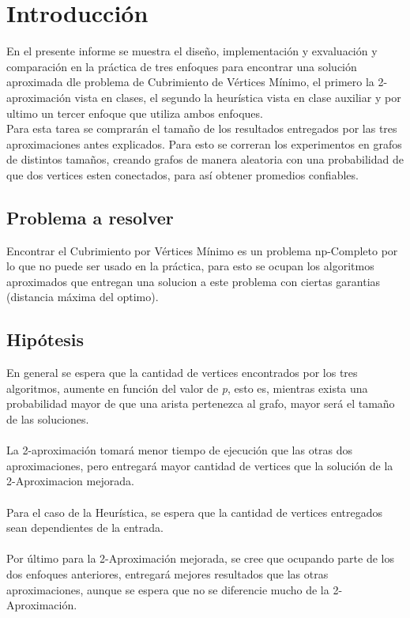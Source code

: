 \documentclass[letterpaper,10pt]{article}
\begin{document}
	\newpage

	\section{Introducción}

	En el presente informe se muestra el diseño, implementación y exvaluación y comparación en la práctica de tres enfoques para encontrar una solución aproximada dle problema de Cubrimiento de Vértices Mínimo, el primero la 2-aproximación vista en clases, el segundo la heurística vista en clase auxiliar y por ultimo un tercer enfoque que utiliza ambos enfoques.\\

	 Para esta tarea se comprarán el tamaño de los resultados entregados por las tres aproximaciones antes explicados. Para esto se correran los experimentos en grafos de distintos tamaños, creando grafos de manera aleatoria con una probabilidad de que dos vertices esten conectados, para así obtener promedios confiables. 
	
	\subsection{Problema a resolver}

	Encontrar el Cubrimiento por Vértices Mínimo es un problema np-Completo por lo que no puede ser usado en la práctica, para esto se ocupan los algoritmos aproximados que entregan una solucion a este problema con ciertas garantias (distancia máxima del optimo). 

	\subsection{Hipótesis}
	
	
	En general se espera que la cantidad de vertices encontrados por los tres algoritmos, aumente en función del valor de \textit{p}, esto es, mientras exista una probabilidad mayor de que una arista pertenezca al grafo, mayor será el tamaño de las soluciones.
	\\\\
    La 2-aproximación tomará menor tiempo de ejecución que las otras dos aproximaciones, pero entregará mayor cantidad de vertices que la solución de la 2-Aproximacion mejorada.
    \\\\
    Para el caso de la Heurística, se espera que la cantidad de vertices entregados sean dependientes de la entrada. 
    \\\\
    Por último para la 2-Aproximación mejorada, se cree que ocupando parte de los dos enfoques anteriores, entregará mejores resultados que las otras aproximaciones, aunque se espera que no se diferencie mucho de la 2-Aproximación.
	
\end{document}
